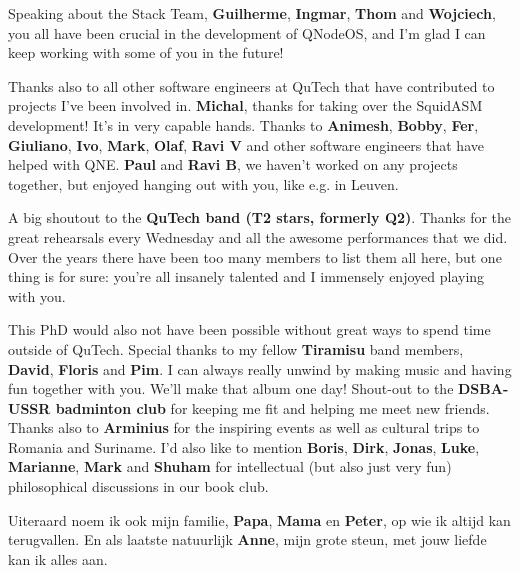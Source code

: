 Speaking about the Stack Team,
\textbf{Guilherme}, \textbf{Ingmar}, \textbf{Thom} and \textbf{Wojciech}, you all have been crucial in the development of QNodeOS, and I'm glad I can keep working with some of you in the future!

Thanks also to all other software engineers at QuTech that have contributed to projects I've been involved in.
\textbf{Michal}, thanks for taking over the SquidASM development! It's in very capable hands.
Thanks to \textbf{Animesh}, \textbf{Bobby}, \textbf{Fer}, \textbf{Giuliano}, \textbf{Ivo}, \textbf{Mark}, \textbf{Olaf}, \textbf{Ravi V} and other software engineers that have helped with QNE.
\textbf{Paul} and \textbf{Ravi B}, we haven't worked on any projects together, but enjoyed hanging out with you, like e.g. in Leuven.

A big shoutout to the \textbf{QuTech band (T2 stars, formerly Q2)}.
Thanks for the great rehearsals every Wednesday and all the awesome performances that we did.
Over the years there have been too many members to list them all here, but one thing is for sure: you're all insanely talented and I immensely enjoyed playing with you.

This PhD would also not have been possible without great ways to spend time outside of QuTech.
Special thanks to my fellow \textbf{Tiramisu} band members, \textbf{David}, \textbf{Floris} and \textbf{Pim}.
I can always really unwind by making music and having fun together with you.
We'll make that album one day!
Shout-out to the \textbf{DSBA-USSR badminton club} for keeping me fit and helping me meet new friends.
Thanks also to \textbf{Arminius} for the inspiring events as well as cultural trips to Romania and Suriname.
I'd also like to mention \textbf{Boris}, \textbf{Dirk}, \textbf{Jonas}, \textbf{Luke}, \textbf{Marianne}, \textbf{Mark} and \textbf{Shuham} for intellectual (but also just very fun) philosophical discussions in our book club.

Uiteraard noem ik ook mijn familie, \textbf{Papa}, \textbf{Mama} en \textbf{Peter}, op wie ik altijd kan terugvallen.
En als laatste natuurlijk \textbf{Anne}, mijn grote steun, met jouw liefde kan ik alles aan.







